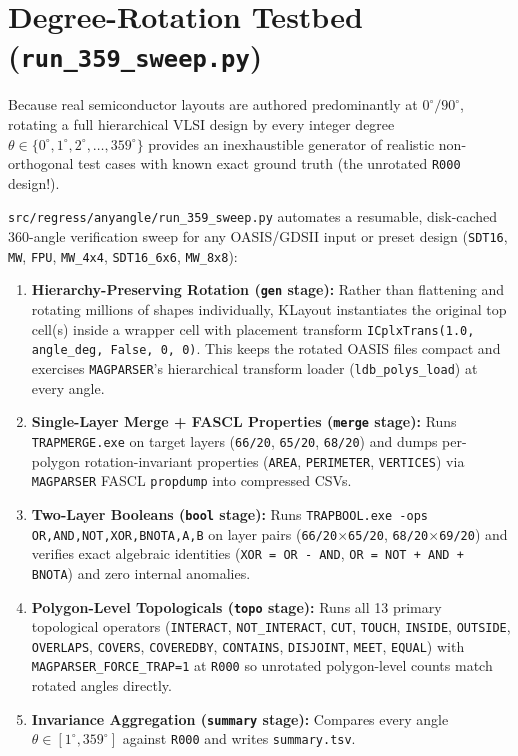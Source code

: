 \section{Degree-Rotation Testbed (\texttt{run\_359\_sweep.py})}

Because real semiconductor layouts are authored predominantly at $0^\circ/90^\circ$, rotating a full hierarchical VLSI design by every integer degree $\theta \in \{0^\circ, 1^\circ, 2^\circ, \dots, 359^\circ\}$ provides an inexhaustible generator of realistic non-orthogonal test cases with known exact ground truth (the unrotated \texttt{R000} design!).

\texttt{src/regress/anyangle/run\_359\_sweep.py} automates a resumable, disk-cached 360-angle verification sweep for any OASIS/GDSII input or preset design (\texttt{SDT16}, \texttt{MW}, \texttt{FPU}, \texttt{MW\_4x4}, \texttt{SDT16\_6x6}, \texttt{MW\_8x8}):
\begin{enumerate}
  \item \textbf{Hierarchy-Preserving Rotation (\texttt{gen} stage):} Rather than flattening and rotating millions of shapes individually, KLayout instantiates the original top cell(s) inside a wrapper cell with placement transform \texttt{ICplxTrans(1.0, angle\_deg, False, 0, 0)}. This keeps the rotated OASIS files compact and exercises \texttt{MAGPARSER}'s hierarchical transform loader (\texttt{ldb\_polys\_load}) at every angle.
  \item \textbf{Single-Layer Merge + FASCL Properties (\texttt{merge} stage):} Runs \texttt{TRAPMERGE.exe} on target layers (\texttt{66/20}, \texttt{65/20}, \texttt{68/20}) and dumps per-polygon rotation-invariant properties (\texttt{AREA}, \texttt{PERIMETER}, \texttt{VERTICES}) via \texttt{MAGPARSER} FASCL \texttt{propdump} into compressed CSVs.
  \item \textbf{Two-Layer Booleans (\texttt{bool} stage):} Runs \texttt{TRAPBOOL.exe -ops OR,AND,NOT,XOR,BNOTA,A,B} on layer pairs (\texttt{66/20}$\times$\texttt{65/20}, \texttt{68/20}$\times$\texttt{69/20}) and verifies exact algebraic identities (\texttt{XOR = OR - AND}, \texttt{OR = NOT + AND + BNOTA}) and zero internal anomalies.
  \item \textbf{Polygon-Level Topologicals (\texttt{topo} stage):} Runs all 13 primary topological operators (\texttt{INTERACT}, \texttt{NOT\_INTERACT}, \texttt{CUT}, \texttt{TOUCH}, \texttt{INSIDE}, \texttt{OUTSIDE}, \texttt{OVERLAPS}, \texttt{COVERS}, \texttt{COVEREDBY}, \texttt{CONTAINS}, \texttt{DISJOINT}, \texttt{MEET}, \texttt{EQUAL}) with \texttt{MAGPARSER\_FORCE\_TRAP=1} at \texttt{R000} so unrotated polygon-level counts match rotated angles directly.
  \item \textbf{Invariance Aggregation (\texttt{summary} stage):} Compares every angle $\theta \in [1^\circ, 359^\circ]$ against \texttt{R000} and writes \texttt{summary.tsv}.
\end{enumerate}

